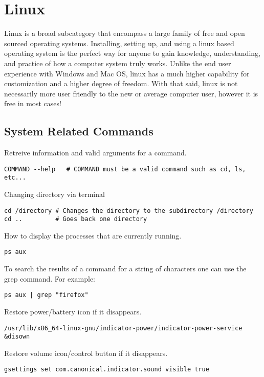 \chapter{Linux}
\thispagestyle{fancy}
\lstset{language=Bash, style=bash}

Linux is a broad subcategory that encompass a large family of free and open sourced operating systems. Installing, setting up, and using a linux based operating system is the perfect way for anyone to gain knowledge, understanding, and practice of how a computer system truly works. Unlike the end user experience with Windows and Mac OS, linux has a much higher capability for customization and a higher degree of freedom. With that said, linux is not necessarily more user friendly to the new or average computer user, however it is free in most cases!

\section{System Related Commands}

Retreive information and valid arguments for a command.
\begin{lstlisting}
COMMAND --help   # COMMAND must be a valid command such as cd, ls, etc...
\end{lstlisting}

Changing directory via terminal
\begin{lstlisting}
cd /directory # Changes the directory to the subdirectory /directory
cd ..         # Goes back one directory
\end{lstlisting}

How to display the processes that are currently running.
\begin{lstlisting}
ps aux
\end{lstlisting}

To search the results of a command for a string of characters one can use the grep command. For example:
\begin{lstlisting}
ps aux | grep "firefox"
\end{lstlisting}

Restore power/battery icon if it disappears.
\begin{lstlisting}
/usr/lib/x86_64-linux-gnu/indicator-power/indicator-power-service &disown 
\end{lstlisting}

Restore volume icon/control button if it disappears.
\begin{lstlisting}
gsettings set com.canonical.indicator.sound visible true
\end{lstlisting}

